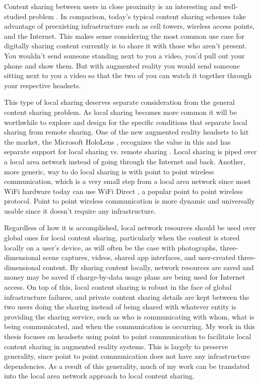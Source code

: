 \documentclass[12pt]{report}
\begin{document}
Content sharing between users in close proximity is an interesting and well-studied problem \cite{TalkingToStrangersSmetters2002,P2pMobileSocialContentSharingQureshi2010,CarTorrentLee2007,P2pFileSharingMobileAdHocKlemm2003,VanetcodeVehicularNetworkCodingShabbir2006,CodeTorrentVanetLee2006,AdHocSharingSystemPatentVan2006}. In comparison, today's typical content sharing schemes take advantage of preexisting infrastructure such as cell towers, wireless access points, and the Internet. This makes sense considering the most common use case for digitally sharing content currently is to share it with those who aren't present. You wouldn't send someone standing next to you a video, you'd pull out your phone and show them. But with augmented reality you would send someone sitting next to you a video so that the two of you can watch it together through your respective headsets. \par

This type of local sharing deserves separate consideration from the general content sharing problem. As local sharing becomes more common it will be worthwhile to explore and design for the specific conditions that separate local sharing from remote sharing. One of the new augmented reality headsets to hit the market, the Microsoft HoloLens \cite{HoloLensWebsite}, recognizes the value in this and has separate support for local sharing vs. remote sharing \cite{HoloLensSharingLocalNetwork2016}. Local sharing is piped over a local area network instead of going through the Internet and back. Another, more generic, way to do local sharing is with point to point wireless communication, which is a very small step from a local area network since most WiFi hardware today can use WiFi Direct \cite{WiFiDirectP2p2014}, a popular point to point wireless protocol. Point to point wireless communication is more dynamic and universally usable since it doesn't require any infrastructure. \par

Regardless of how it is accomplished, local network resources should be used over global ones for local content sharing, particularly when the content is stored locally on a user's device, as will often be the case with photographs, three-dimensional scene captures, videos, shared app interfaces, and user-created three-dimensional content. By sharing content locally, network resources are saved and money may be saved if charge-by-data usage plans are being used for Internet access. On top of this, local content sharing is robust in the face of global infrastructure failures, and private content sharing details are kept between the two users doing the sharing instead of being shared with whatever entity is providing the sharing service, such as who is communicating with whom, what is being communicated, and when the communication is occurring. My work in this thesis focuses on headsets using point to point communication to facilitate local content sharing in augmented reality systems. This is largely to preserve generality, since point to point communication does not have any infrastructure dependencies. As a result of this generality, much of my work can be translated into the local area network approach to local content sharing. \par
\end{document}

